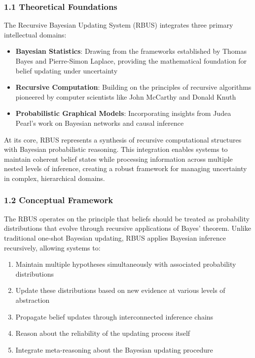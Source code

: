 \documentclass[
]{article}
\providecommand{\tightlist}{%
  \setlength{\itemsep}{0pt}\setlength{\parskip}{0pt}}
\begin{document}
\subsubsection{1.1 Theoretical
Foundations}\label{theoretical-foundations}

The Recursive Bayesian Updating System (RBUS) integrates three primary
intellectual domains:

\begin{itemize}
\tightlist
\item
  \textbf{Bayesian Statistics}: Drawing from the frameworks established
  by Thomas Bayes and Pierre-Simon Laplace, providing the mathematical
  foundation for belief updating under uncertainty
\item
  \textbf{Recursive Computation}: Building on the principles of
  recursive algorithms pioneered by computer scientists like John
  McCarthy and Donald Knuth
\item
  \textbf{Probabilistic Graphical Models}: Incorporating insights from
  Judea Pearl's work on Bayesian networks and causal inference
\end{itemize}

At its core, RBUS represents a synthesis of recursive computational
structures with Bayesian probabilistic reasoning. This integration
enables systems to maintain coherent belief states while processing
information across multiple nested levels of inference, creating a
robust framework for managing uncertainty in complex, hierarchical
domains.

\subsubsection{1.2 Conceptual Framework}\label{conceptual-framework-1}

The RBUS operates on the principle that beliefs should be treated as
probability distributions that evolve through recursive applications of
Bayes' theorem. Unlike traditional one-shot Bayesian updating, RBUS
applies Bayesian inference recursively, allowing systems to:

\begin{enumerate}
\def\labelenumi{\arabic{enumi}.}
\tightlist
\item
  Maintain multiple hypotheses simultaneously with associated
  probability distributions
\item
  Update these distributions based on new evidence at various levels of
  abstraction
\item
  Propagate belief updates through interconnected inference chains
\item
  Reason about the reliability of the updating process itself
\item
  Integrate meta-reasoning about the Bayesian updating procedure
\end{enumerate}
\end{document}
